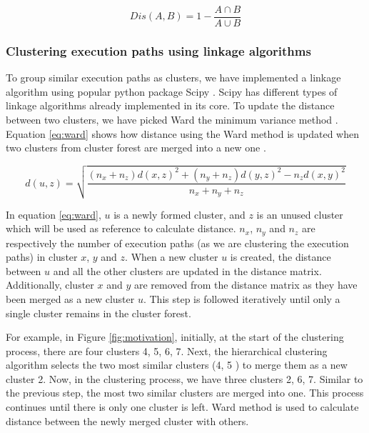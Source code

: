 \begin{equation}
Dis(A, B) = 1 - \frac{A\cap B}{A\cup B}
\label{eq:jaccard}
\end{equation}

\subsubsection{Clustering execution paths using linkage algorithms}

To group similar execution paths as clusters, we have implemented a linkage algorithm using popular python package Scipy \cite{scipy}. Scipy has different types of linkage algorithms already implemented in its core. To update the distance between two clusters, we have picked Ward the minimum variance method \cite{ward}. Equation \ref{eq:ward} shows how distance using the Ward method is updated when two clusters from cluster forest are merged into a new one \cite{scipy}.

\begin{equation}
     d(u, z) =   \sqrt{\frac{(n_x+n_z)d(x,z)^2+ (n_y+n_z)d(y,z)^2 - n_z d(x,y)^2 }{n_x+n_y+n_z}}
    \label{eq:ward}
\end{equation}

 
In equation \ref{eq:ward}, $u$ is a newly formed cluster, and $z$ is an unused cluster which will be used as reference to calculate distance. $n_x$, $n_y$ and $n_z$ are respectively the number of execution paths (as we are clustering the execution paths) in cluster $x$, $y$ and $z$.
When a new cluster $u$ is created, the distance between $u$ and all the other clusters are updated in the distance matrix. Additionally, cluster $x$ and $y$ are removed from the distance matrix as they have been merged as a new cluster $u$. This step is followed iteratively until only a single cluster remains in the cluster forest. 

For example, in Figure \ref{fig:motivation}, initially, at the start of the clustering process, there are four clusters 4, 5, 6, 7. Next, the hierarchical clustering algorithm selects the two most similar clusters (4, 5 ) to merge them as a new cluster 2. Now, in the clustering process, we have three clusters 2, 6, 7. Similar to the previous step, the most two similar clusters are merged into one. This process continues until there is only one cluster is left. Ward method is used to calculate distance between the newly merged cluster with others.


